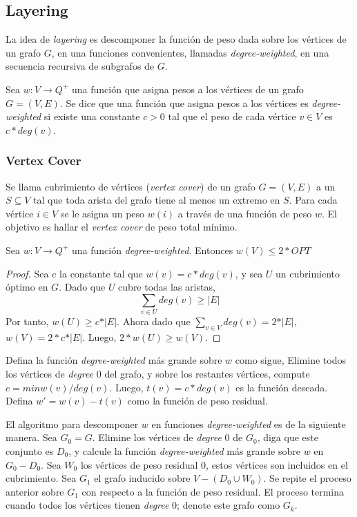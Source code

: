 \documentclass[../np-approximations.tex]{subfiles}
\begin{document}
\subsection{Layering}

La idea de \emph{layering} es descomponer la función de peso dada
sobre los vértices de un grafo $G$, en una funciones convenientes, 
llamadas \emph{degree-weighted}, en una secuencia recursiva de 
subgrafos de $G$.

Sea $w:V \rightarrow Q^+$ una función que asigna pesos a los 
vértices de un grafo $G=(V,E)$. Se dice que una función que asigna
pesos a los vértices es \emph{degree-weighted} si existe una 
constante $c>0$ tal que el peso de cada vértice $v \in V$ es
$c*deg(v)$.

\subsubsection{Vertex Cover}

\begin{statement}
	Se llama cubrimiento de vértices (\emph{vertex cover}) de un 
	grafo $G=(V,E)$ a un $S \subseteq V$ tal que toda arista del 
	grafo tiene al menos un extremo en $S$. Para cada vértice
	$i \in V$ se le asigna un peso $w(i)$ a través de una función 
	de 	peso $w$. El objetivo es hallar el \emph{vertex cover} de 
	peso total mínimo.
\end{statement}

\begin{lemma}
	\label{lemma:vertex-cover}
	Sea $w:V \rightarrow Q^+$ una función \emph{degree-weighted}. 
	Entonces $w(V) \le 2*OPT$
\end{lemma}

\begin{proof}
	Sea c la constante tal que $w(v)=c*deg(v)$, y sea $U$ un 
	cubrimiento óptimo en $G$. Dado que $U$ cubre todas las aristas,
	$$\sum_{v \in U}deg(v) \ge \vert E \vert$$
	Por tanto, $w(U) \ge c * \vert E \vert$. Ahora dado que
	$\sum_{v \in V}deg(v) = 2 * \vert E \vert$,
	$w(V) = 2*c * \vert E \vert$. Luego, $2*w(U) \ge w(V)$.
\end{proof}

Defina la función \emph{degree-weighted} más grande sobre $w$ como 
sigue, Elimine todos los vértices de \emph{degree} 0 del grafo, y 
sobre los restantes vértices, compute $c=min{w(v)/deg(v)}$. Luego,
$t(v)=c*deg(v)$ es la función deseada. Defina $w'=w(v)-t(v)$ como 
la función de peso residual.

El algoritmo para descomponer $w$ en funciones 
\emph{degree-weighted}
es de la siguiente manera. Sea $G_0=G$. Elimine los vértices de
\emph{degree} 0 de $G_0$, diga que este conjunto es $D_0$, y 
calcule la función \emph{degree-weighted} más grande sobre $w$ en 
$G_0-D_0$. Sea $W_0$ los vértices de peso residual 0, estos 
vértices son incluidos en el cubrimiento. Sea $G_1$ el grafo 
inducido sobre $V-(D_0 \cup W_0)$. Se repite el proceso anterior 
sobre $G_1$ con respecto a la función de peso residual. El proceso 
termina cuando todos los vértices tienen \emph{degree} 0; denote 
este grafo como $G_k$.
\end{document}
